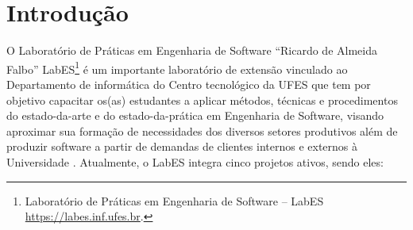 \chapter{Introdução}
\label{sec-intro}
O Laboratório de Práticas em Engenharia de Software “Ricardo de Almeida Falbo” LabES\footnote{Laboratório de Práticas em Engenharia de Software – LabES \url{https://labes.inf.ufes.br}.}
 é um importante laboratório de extensão vinculado ao Departamento de informática do Centro tecnológico da UFES que tem por objetivo capacitar os(as) estudantes a aplicar métodos, técnicas e procedimentos do estado-da-arte e do estado-da-prática em Engenharia de Software, visando aproximar sua formação de necessidades dos diversos setores produtivos além de produzir software a partir de demandas de clientes internos e externos à Universidade \cite{LabES}. Atualmente, o LabES integra cinco projetos ativos, sendo eles:
